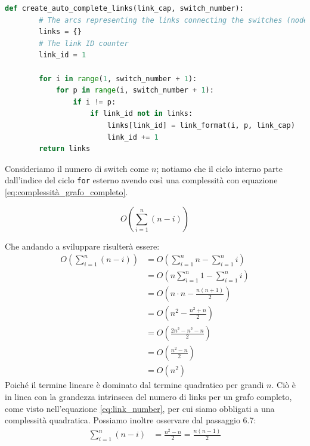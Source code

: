\documentclass[binding=0.6cm]{sapthesis}
\begin{document}
{\scriptsize %
\begin{lstlisting}[language=Python, basicstyle=\ttfamily, caption={Funzione per la creazione automatica di un grafo di rete completo}, label={codice:create_auto_complete_links}]
    def create_auto_complete_links(link_cap, switch_number):
        # The arcs representing the links connecting the switches (nodes)
        links = {}
        # The link ID counter
        link_id = 1

        for i in range(1, switch_number + 1):
            for p in range(i, switch_number + 1):
                if i != p:
                    if link_id not in links:
                        links[link_id] = link_format(i, p, link_cap)
                        link_id += 1
        return links
\end{lstlisting}
} %

Consideriamo il numero di switch come \(n\); notiamo che il ciclo interno parte dall'indice del ciclo \texttt{for} esterno
avendo così una complessità con equazione \ref{eq:complessità_grafo_completo}.

\begin{equation}
    \label{eq:complessità_grafo_completo}
    O\left(\sum_{i=1}^n (n-i)\right)
\end{equation}

Che andando a sviluppare risulterà essere:
\begin{align}
    O\left(\sum_{i=1}^n (n-i)\right) &= O\left(\sum_{i=1}^n n - \sum_{i=1}^n i\right) \\
    &= O\left(n\sum_{i=1}^n 1 - \sum_{i=1}^n i\right) \\
    &= O\left(n \cdot n - \frac{n(n+1)}{2}\right) \\
    &= O\left(n^2 - \frac{n^2 + n}{2}\right) \\
    &= O\left(\frac{2n^2 - n^2 - n}{2}\right) \\
    &= O\left(\frac{n^2 - n}{2}\right) \\
    &= O(n^2) \quad
    \end{align}
Poiché il termine lineare è dominato dal termine quadratico per grandi \( n \). Ciò è in linea con la grandezza intrinseca del numero di links
per un grafo completo, come visto nell'equazione \ref{eq:link_number}, per cui siamo obbligati a una complessità quadratica.
Possiamo inoltre osservare dal passaggio 6.7:
\begin{align*}
    \sum_{i=1}^n (n-i) &= \frac{n^2 - n}{2} = \frac{n(n-1)}{2}
\end{align*}
    
\end{document}
